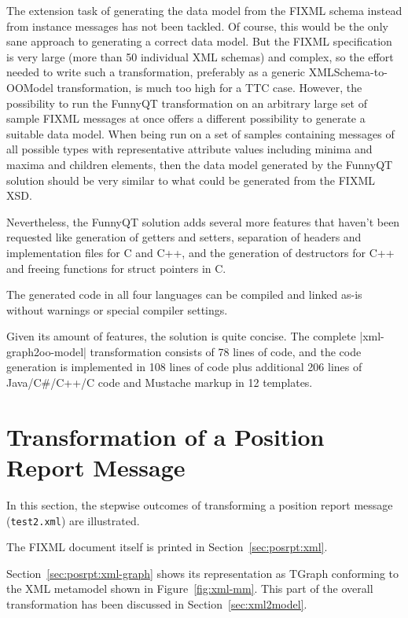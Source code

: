 \documentclass[a4paper]{article}
\newcommand{\code}{\clojureinline}
\begin{document}
The extension task of generating the data model from the FIXML schema instead
from instance messages has not been tackled.  Of course, this would be the only
sane approach to generating a correct data model.  But the FIXML specification
is very large (more than 50 individual XML schemas) and complex, so the effort
needed to write such a transformation, preferably as a generic
XMLSchema-to-OOModel transformation, is much too high for a TTC case.  However,
the possibility to run the FunnyQT transformation on an arbitrary large set of
sample FIXML messages at once offers a different possibility to generate a
suitable data model.  When being run on a set of samples containing messages of
all possible types with representative attribute values including minima and
maxima and children elements, then the data model generated by the FunnyQT
solution should be very similar to what could be generated from the FIXML XSD.

Nevertheless, the FunnyQT solution adds several more features that haven't been
requested like generation of getters and setters, separation of headers and
implementation files for C and C++, and the generation of destructors for C++
and freeing functions for struct pointers in C.

The generated code in all four languages can be compiled and linked as-is
without warnings or special compiler settings.

Given its amount of features, the solution is quite concise.  The complete
\code|xml-graph2oo-model| transformation consists of 78 lines of code, and the
code generation is implemented in 108 lines of code plus additional 206 lines
of Java/C\#/C++/C code and Mustache markup in 12 templates.







\newpage
\appendix

\section{Transformation of a Position Report Message}
\label{sec:posrpt}

In this section, the stepwise outcomes of transforming a position report
message (\texttt{test2.xml}) are illustrated.

The FIXML document itself is printed in Section~\ref{sec:posrpt:xml}.

Section~\ref{sec:posrpt:xml-graph} shows its representation as TGraph
conforming to the XML metamodel shown in Figure~\ref{fig:xml-mm}.  This part of
the overall transformation has been discussed in Section~\ref{sec:xml2model}.
\end{document}
